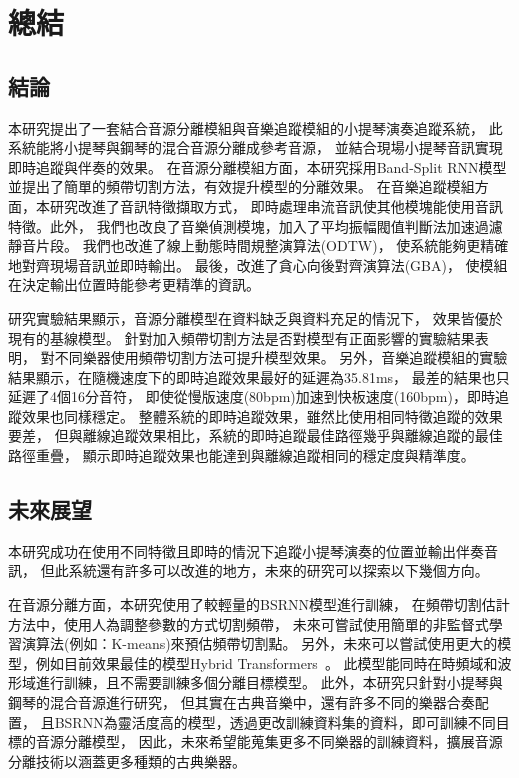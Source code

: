 \documentclass[class=NCU_thesis, crop=false]{standalone}
\begin{document}
\chapter{總結}

\section{結論}
本研究提出了一套結合音源分離模組與音樂追蹤模組的小提琴演奏追蹤系統，
此系統能將小提琴與鋼琴的混合音源分離成參考音源，
並結合現場小提琴音訊實現即時追蹤與伴奏的效果。
在音源分離模組方面，本研究採用Band-Split RNN模型
並提出了簡單的頻帶切割方法，有效提升模型的分離效果。
在音樂追蹤模組方面，本研究改進了音訊特徵擷取方式，
即時處理串流音訊使其他模塊能使用音訊特徵。此外，
我們也改良了音樂偵測模塊，加入了平均振幅閥值判斷法加速過濾靜音片段。
我們也改進了線上動態時間規整演算法(ODTW)，
使系統能夠更精確地對齊現場音訊並即時輸出。
最後，改進了貪心向後對齊演算法(GBA)，
使模組在決定輸出位置時能參考更精準的資訊。

研究實驗結果顯示，音源分離模型在資料缺乏與資料充足的情況下，
效果皆優於現有的基線模型。
針對加入頻帶切割方法是否對模型有正面影響的實驗結果表明，
對不同樂器使用頻帶切割方法可提升模型效果。
另外，音樂追蹤模組的實驗結果顯示，在隨機速度下的即時追蹤效果最好的延遲為35.81ms，
最差的結果也只延遲了4個16分音符，
即使從慢版速度(80bpm)加速到快板速度(160bpm)，即時追蹤效果也同樣穩定。
整體系統的即時追蹤效果，雖然比使用相同特徵追蹤的效果要差，
但與離線追蹤效果相比，系統的即時追蹤最佳路徑幾乎與離線追蹤的最佳路徑重疊，
顯示即時追蹤效果也能達到與離線追蹤相同的穩定度與精準度。

\pagebreak

\section{未來展望}
本研究成功在使用不同特徵且即時的情況下追蹤小提琴演奏的位置並輸出伴奏音訊，
但此系統還有許多可以改進的地方，未來的研究可以探索以下幾個方向。

在音源分離方面，本研究使用了較輕量的BSRNN模型進行訓練，
在頻帶切割估計方法中，使用人為調整參數的方式切割頻帶，
未來可嘗試使用簡單的非監督式學習演算法(例如：K-means)來預估頻帶切割點。
另外，未來可以嘗試使用更大的模型，例如目前效果最佳的模型Hybrid Transformers~\cite{rouard2023hybrid}。
此模型能同時在時頻域和波形域進行訓練，且不需要訓練多個分離目標模型。
此外，本研究只針對小提琴與鋼琴的混合音源進行研究，
但其實在古典音樂中，還有許多不同的樂器合奏配置，
且BSRNN為靈活度高的模型，透過更改訓練資料集的資料，即可訓練不同目標的音源分離模型，
因此，未來希望能蒐集更多不同樂器的訓練資料，擴展音源分離技術以涵蓋更多種類的古典樂器。
\end{document}
